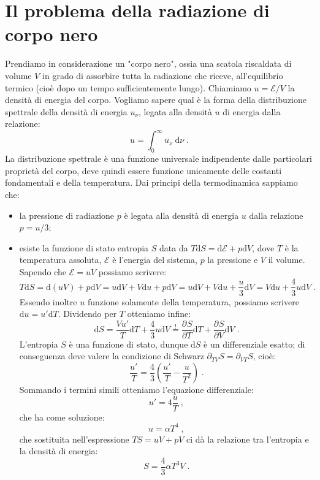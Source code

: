 \documentclass[10pt,a4paper]{report}
\theoremstyle{definition}
\newcommand{\pdev}[3][]{\frac{\partial^{#1} #2}{\partial #3^{#1}}}
\numberwithin{equation}{section}
\newcommand{\diff}[1][]{\mathrm{d}#1}
\begin{document}
\section{Il problema della radiazione di corpo nero}
Prendiamo in considerazione un "corpo nero", ossia una scatola riscaldata di volume $V$ in grado di assorbire tutta la radiazione che riceve, all'equilibrio termico (cioè dopo un tempo sufficientemente lungo). Chiamiamo $u= \mathcal{E}/V$ la densità di energia del corpo. Vogliamo sapere qual è la forma della distribuzione spettrale della densità di energia $u_{\nu}$, legata alla densità $u$ di energia dalla relazione:
\begin{equation}
u=\int_0^{\infty} u_{\nu}\;\diff{\nu}\;.
\end{equation}
La distribuzione spettrale è una funzione universale indipendente dalle particolari proprietà del corpo, deve quindi essere funzione unicamente delle costanti fondamentali e della temperatura. Dai principi della termodinamica sappiamo che:
\begin{itemize}
\item la pressione di radiazione $p$ è legata alla densità di energia $u$ dalla relazione $p=u/3$;
\item esiste la funzione di stato entropia $S$ data da $T\diff{S}=\diff{\mathcal{E}}+p\diff{V}$, dove $T$ è la temperatura assoluta, $\mathcal{E}$ è l'energia del sistema, $p$ la pressione e $V$ il volume. Sapendo che $\mathcal{E}=uV$ possiamo scrivere:
$$
T\diff{S}=\diff{(uV)}+p\diff{V}=u\diff{V}+V\diff{u}+p\diff{V}=u\diff{V}+V\diff{u}+\frac{u}{3}\diff{V}=V\diff{u}+\frac{4}{3}u\diff{V}\;.
$$
Essendo inoltre $u$ funzione solamente della temperatura, possiamo scrivere $\diff{u}=u'\diff{T}$. Dividendo per $T$ otteniamo infine:
$$
\diff{S}=\frac{Vu'}{T}\diff{T}+\frac{4}{3}u\diff{V}\stackrel{!}{=}\pdev{S}{T}\diff{T}+\pdev{S}{V}\diff{V}\;.
$$
L'entropia $S$ è una funzione di stato, dunque $\diff{S}$ è un differenziale esatto; di conseguenza deve valere la condizione di Schwarz $\partial_{TV}S=\partial_{VT}S$, cioè:
$$
\frac{u'}{T}=\frac{4}{3}\left(\frac{u'}{T}-\frac{u}{T^2}\right)\;.
$$
Sommando i termini simili otteniamo l'equazione differenziale:
\begin{equation}
u'=4\frac{u}{T}\;,
\end{equation}
che ha come soluzione:
\begin{equation}
u=\alpha T^4\;,
\end{equation}
che sostituita nell'espressione $TS=uV+pV$ ci dà la relazione tra l'entropia e la densità di energia:
\begin{equation}
S=\frac{4}{3}\alpha T^3 V\;.
\end{equation}
\end{itemize}
\end{document}
